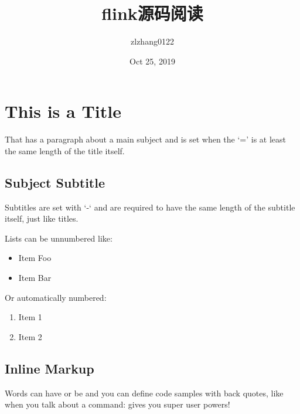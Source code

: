 \documentclass[letterpaper,10pt,english]{sphinxmanual}
\title{flink源码阅读}
\date{Oct 25, 2019}
\author{zlzhang0122}
\begin{document}
\pagestyle{empty}
\sphinxmaketitle
\pagestyle{plain}
\sphinxtableofcontents
\pagestyle{normal}
\label{\detokenize{index::doc}}



\chapter{This is a Title}
\label{\detokenize{example:this-is-a-title}}\label{\detokenize{example::doc}}
That has a paragraph about a main subject and is set when the ‘=’
is at least the same length of the title itself.


\section{Subject Subtitle}
\label{\detokenize{example:subject-subtitle}}
Subtitles are set with ‘-‘ and are required to have the same length
of the subtitle itself, just like titles.

Lists can be unnumbered like:
\begin{itemize}
\item {} 
Item Foo

\item {} 
Item Bar

\end{itemize}

Or automatically numbered:
\begin{enumerate}
%
\item {} 
Item 1

\item {} 
Item 2

\end{enumerate}


\section{Inline Markup}
\label{\detokenize{example:inline-markup}}
Words can have  or be  and you can define
code samples with back quotes, like when you talk about a command: 
gives you super user powers!
\end{document}
